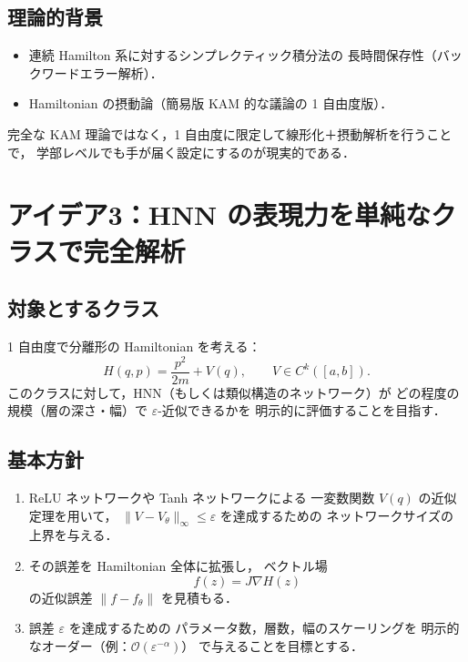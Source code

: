 \documentclass[a4paper,12pt]{jlreq}
\begin{document}
\subsection*{理論的背景}

\begin{itemize}
  \item 連続 Hamilton 系に対するシンプレクティック積分法の
        長時間保存性（バックワードエラー解析）．
  \item Hamiltonian の摂動論（簡易版 KAM 的な議論の 1 自由度版）．
\end{itemize}

完全な KAM 理論ではなく，1 自由度に限定して線形化＋摂動解析を行うことで，
学部レベルでも手が届く設定にするのが現実的である．

\bigskip

\section*{アイデア3：HNN の表現力を単純なクラスで完全解析}

\subsection*{対象とするクラス}

1 自由度で分離形の Hamiltonian を考える：
\[
  H(q,p)
  =
  \frac{p^2}{2m} + V(q),
  \qquad
  V \in C^k([a,b]) .
\]
このクラスに対して，HNN（もしくは類似構造のネットワーク）が
どの程度の規模（層の深さ・幅）で \(\varepsilon\)-近似できるかを
明示的に評価することを目指す．

\subsection*{基本方針}

\begin{enumerate}
  \item ReLU ネットワークや Tanh ネットワークによる
        一変数関数 \(V(q)\) の近似定理を用いて，
        \(\|V - V_\theta\|_\infty \le \varepsilon\) を達成するための
        ネットワークサイズの上界を与える．
  \item その誤差を Hamiltonian 全体に拡張し，
        ベクトル場
        \[
          f(z) = J \nabla H(z)
        \]
        の近似誤差 \(\| f - f_\theta \|\) を見積もる．
  \item 誤差 \(\varepsilon\) を達成するための
        パラメータ数，層数，幅のスケーリングを
        明示的なオーダー（例：\(\mathcal{O}(\varepsilon^{-\alpha})\)）
        で与えることを目標とする．
\end{enumerate}
\end{document}
